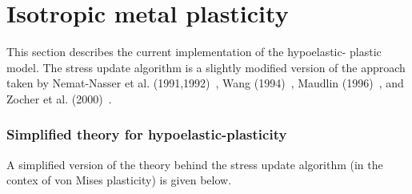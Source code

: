 \chapter{Isotropic metal plasticity}

This section describes the current implementation of the hypoelastic-
plastic model.  The stress update algorithm is a slightly modified 
version of the approach taken by 
Nemat-Nasser et al. (1991,1992)~\cite{Nemat1991,Nemat1992}, Wang (1994)~\cite{Wang1994}, 
Maudlin (1996)~\cite{Maudlin1996}, and Zocher et al. (2000)~\cite{Zocher2000}.  

\subsection{Simplified theory for hypoelastic-plasticity}
A simplified version of the theory behind the stress update algorithm
(in the contex of von Mises plasticity) is given below.

